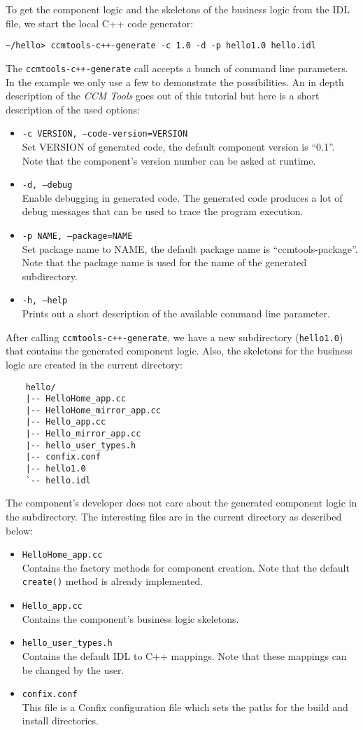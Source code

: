 To get the component logic and the skeletons of the business logic from the IDL file, 
we start the local C++ code generator:
\begin{verbatim}
~/hello> ccmtools-c++-generate -c 1.0 -d -p hello1.0 hello.idl
\end{verbatim}
The {\tt ccmtools-c++-generate} call accepts a bunch of command line parameters. In the
example we only use a few to demonstrate the possibilities.
An in depth description of the {\it CCM Tools} goes out of this tutorial but 
here is a short description of the used options:
\begin{itemize}
\item {\tt -c VERSION, --code-version=VERSION }\\
Set VERSION of generated code, the default component version is ``0.1''.
Note that the component's version number can be asked at runtime.  

\item {\tt -d, --debug }\\
Enable debugging in generated code. The generated code produces a lot of
debug messages that can be used to trace the program execution.

\item {\tt -p NAME, --package=NAME}\\
Set package name to NAME, the default package name is ``ccmtools-package''.
Note that the package name is used for the name of the generated subdirectory.

\item {\tt -h, --help}\\
Prints out a short description of the available command line parameter.
\end{itemize}
After calling {\tt ccmtools-c++-generate}, we have a new subdirectory ({\tt hello1.0}) that 
contains the generated component logic. Also, the skeletons for the business logic are
created in the current directory:
\begin{verbatim}
    hello/
    |-- HelloHome_app.cc
    |-- HelloHome_mirror_app.cc
    |-- Hello_app.cc
    |-- Hello_mirror_app.cc
    |-- hello_user_types.h
    |-- confix.conf
    |-- hello1.0
    `-- hello.idl
\end{verbatim}
The component's developer does not care about the generated component logic in the
subdirectory. The interesting files are in the current directory as described below:
\begin{itemize}
\item {\tt HelloHome\_app.cc} \\
Contains the factory methods for component creation. 
Note that the default {\tt create()} method is already implemented.
\item {\tt Hello\_app.cc} \\
Contains the component's business logic skeletons.
\item {\tt hello\_user\_types.h} \\
Contains the default IDL to C++ mappings. Note that these mappings can be 
changed by the user.
\item {\tt confix.conf}\\
This file is a Confix configuration file which sets the paths for
the build and install directories. 
\end{itemize}
